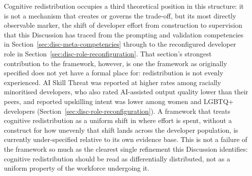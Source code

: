 Cognitive redistribution occupies a third theoretical position in this structure: it is not a mechanism that creates or governs the trade-off, but its most directly observable marker, the shift of developer effort from construction to supervision that this Discussion has traced from the prompting and validation competencies in Section~\ref{sec:disc-meta-competencies} through to the reconfigured developer role in Section~\ref{sec:disc-role-reconfiguration}. That section's strongest contribution to the framework, however, is one the framework as originally specified does not yet have a formal place for: redistribution is not evenly experienced. AI Skill Threat was reported at higher rates among racially minoritised developers, who also rated AI-assisted output quality lower than their peers, and reported upskilling intent was lower among women and LGBTQ+ developers (Section~\ref{sec:disc-role-reconfiguration}). A framework that treats cognitive redistribution as a uniform shift in where effort is spent, without a construct for how unevenly that shift lands across the developer population, is currently under-specified relative to its own evidence base. This is not a failure of the framework so much as the clearest single refinement this Discussion identifies: cognitive redistribution should be read as differentially distributed, not as a uniform property of the workforce undergoing it.

